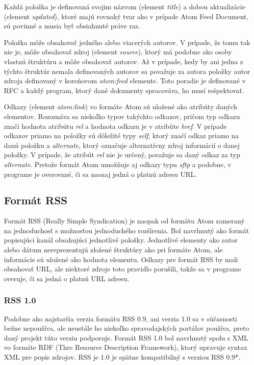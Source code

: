 \documentclass[11pt,a4paper]{article}
\begin{document}
Každá položka je definovaná svojim názvom (element \textit{title}) a dobou aktualizácie (element \textit{updated}), ktoré majú rovnaký tvar ako v prípade Atom Feed Document, sú povinné a musia byť obsiahnuté práve raz.

Položka môže obsahovať jedného alebo viacerých autorov. V prípade, že tomu tak nie je, môže obsahovať zdroj (element \textit{source}), ktorý má podobne ako osoby vlastnú štruktúru a môže obsahovať autorov. Až v prípade, kedy by ani jedna z týchto štruktúr nemala definovaných autorov sa považuje za autora položky autor zdroja definovaný v koreňovom \textit{atom:feed}  elemente. Toto poradie je definované v RFC a každý program, ktorý dané dokumenty spracováva, ho musí rešpektovať.

Odkazy (element \textit{atom:link}) vo formáte Atom sú uložené ako atribúty daných elementov. Rozoznáva sa niekoľko typov takýchto odkazov, pričom typ odkazu značí hodnota atribútu \textit{rel} a hodnota odkazu je v atribúte \textit{href}. V prípade odkazov priamo na položky sú dôležité typy \textit{self}, ktorý značí odkaz priamo na danú položku a \textit{alternate}, ktorý označuje alternatívny zdroj informácií o danej položky. V prípade, že atribút \textit{rel} nie je určený, považuje sa daný odkaz za typ \textit{alternate}. Pretože formát Atom umožňuje aj odkazy typu \textit{sftp} a podobne, v programe je overované, či sa naozaj jedná o platnú adresu URL.

\subsection{Formát RSS}

Formát RSS (Really Simple Syndication) je naopak od formátu Atom zameraný na jednoduchosť s možnosťou jednoduchého rozšírenia. Bol navrhnutý ako formát popisujúci kanál obsahujúci jednotlivé položky. Jednotlivé elementy ako autor alebo dátum nereprezentujú zložené štruktúry ako pri formáte Atom, ale informácie sú uložené ako hodnota elementu. Odkazy pre formát RSS by mali obsahovať URL, ale niektoré zdroje toto pravidlo porušili, takže sa v programe overuje, či sa jedná o platnú URL adresu.

\subsubsection{RSS 1.0}

Podobne ako najstaršia verzia formátu RSS 0.9, ani verzia 1.0 sa v súčasnosti bežne nepoužíva, ale neustále ho niekoľko spravodajských portálov používa, preto daný projekt túto verziu podporuje. Formát RSS 1.0 bol navrhnutý spolu s XML vo formáte RDF (Thre Resource Description Framework), ktorý upravuje syntax XML pre popis zdrojov. RSS je 1.0 je spätne kompatibilný s verziou RSS 0.9*.
\end{document}
